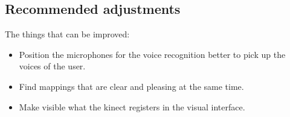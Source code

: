 \documentclass[11pt]{article}
\begin{document}
\subsection{Recommended adjustments} 
The things that can be improved:
\begin{itemize}
\item Position the microphones for the voice recognition better to pick up the voices of the user.
\item Find mappings that are clear and pleasing at the same time.
\item Make visible what the kinect registers in the visual interface.
\end{itemize}
\end{document}
